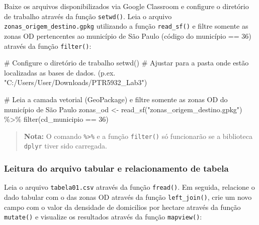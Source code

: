 \documentclass[
  letterpaper,
  DIV=11,
  numbers=noendperiod]{scrreprt}
\newenvironment{Shaded}{\begin{snugshade}}{\end{snugshade}}
\newcommand{\CommentTok}[1]{\textcolor[rgb]{0.37,0.37,0.37}{#1}}
\newcommand{\DecValTok}[1]{\textcolor[rgb]{0.68,0.00,0.00}{#1}}
\newcommand{\FunctionTok}[1]{\textcolor[rgb]{0.28,0.35,0.67}{#1}}
\newcommand{\NormalTok}[1]{\textcolor[rgb]{0.00,0.23,0.31}{#1}}
\newcommand{\OtherTok}[1]{\textcolor[rgb]{0.00,0.23,0.31}{#1}}
\newcommand{\SpecialCharTok}[1]{\textcolor[rgb]{0.37,0.37,0.37}{#1}}
\newcommand{\StringTok}[1]{\textcolor[rgb]{0.13,0.47,0.30}{#1}}
\begin{document}
Baixe os arquivos disponibilizados via Google Classroom e configure o
diretório de trabalho através da função \texttt{setwd()}. Leia o arquivo
\texttt{zonas\_origem\_destino.gpkg} utilizando a função
\texttt{read\_sf()} e filtre somente as zonas OD pertencentes ao
município de São Paulo (código do município == 36) através da função
\texttt{filter()}:

\begin{Shaded}
\begin{Highlighting}[]
\CommentTok{\# Configure o diretório de trabalho}
\FunctionTok{setwd}\NormalTok{() }\CommentTok{\# Ajustar para a pasta onde estão localizadas as bases de dados. (p.ex. "C:/Users/User/Downloads/PTR5932\_Lab3")}

\CommentTok{\# Leia a camada vetorial (GeoPackage) e filtre somente as zonas OD do município de São Paulo }
\NormalTok{zonas\_od }\OtherTok{\textless{}{-}} \FunctionTok{read\_sf}\NormalTok{(}\StringTok{"zonas\_origem\_destino.gpkg"}\NormalTok{) }\SpecialCharTok{\%\textgreater{}\%}
  \FunctionTok{filter}\NormalTok{(cd\_municipio }\SpecialCharTok{==} \DecValTok{36}\NormalTok{)}
\end{Highlighting}
\end{Shaded}

\begin{quote}
\textbf{Nota:} O comando \texttt{\%\textgreater{}\%} e a função
\texttt{filter()} só funcionarão se a biblioteca \texttt{dplyr} tiver
sido carregada.
\end{quote}

\subsubsection{\texorpdfstring{\textbf{Leitura do arquivo tabular e
relacionamento de
tabela}}{Leitura do arquivo tabular e relacionamento de tabela}}\label{leitura-do-arquivo-tabular-e-relacionamento-de-tabela}

Leia o arquivo \texttt{tabela01.csv} através da função \texttt{fread()}.
Em seguida, relacione o dado tabular com o das zonas OD através da
função \texttt{left\_join()}, crie um novo campo com o valor da
densidade de domicilios por hectare através da função \texttt{mutate()}
e visualize os resultados através da função \texttt{mapview()}:
\end{document}
